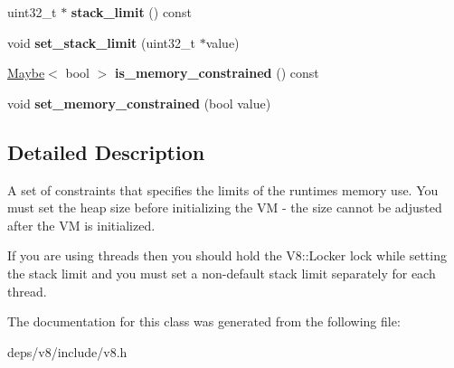 \begin{DoxyCompactItemize}
\item 
\hypertarget{classv8_1_1_resource_constraints_aafc4a94f2eeb0684e7a50f355eb4d06d}{}uint32\+\_\+t $\ast$ {\bfseries stack\+\_\+limit} () const \label{classv8_1_1_resource_constraints_aafc4a94f2eeb0684e7a50f355eb4d06d}

\item 
\hypertarget{classv8_1_1_resource_constraints_a26ed3e89985a4afe34e84509fb093cf1}{}void {\bfseries set\+\_\+stack\+\_\+limit} (uint32\+\_\+t $\ast$value)\label{classv8_1_1_resource_constraints_a26ed3e89985a4afe34e84509fb093cf1}

\item 
\hypertarget{classv8_1_1_resource_constraints_a380bb45e62a1d7a1f9e966a84ebad5e7}{}\hyperlink{structv8_1_1_maybe}{Maybe}$<$ bool $>$ {\bfseries is\+\_\+memory\+\_\+constrained} () const \label{classv8_1_1_resource_constraints_a380bb45e62a1d7a1f9e966a84ebad5e7}

\item 
\hypertarget{classv8_1_1_resource_constraints_af555af9b0fdfc8e7af28274b7b1ba4a5}{}void {\bfseries set\+\_\+memory\+\_\+constrained} (bool value)\label{classv8_1_1_resource_constraints_af555af9b0fdfc8e7af28274b7b1ba4a5}

\end{DoxyCompactItemize}


\subsection{Detailed Description}
A set of constraints that specifies the limits of the runtime\textquotesingle{}s memory use. You must set the heap size before initializing the V\+M -\/ the size cannot be adjusted after the V\+M is initialized.

If you are using threads then you should hold the V8\+::\+Locker lock while setting the stack limit and you must set a non-\/default stack limit separately for each thread. 

The documentation for this class was generated from the following file\+:\begin{DoxyCompactItemize}
\item 
deps/v8/include/v8.\+h\end{DoxyCompactItemize}
